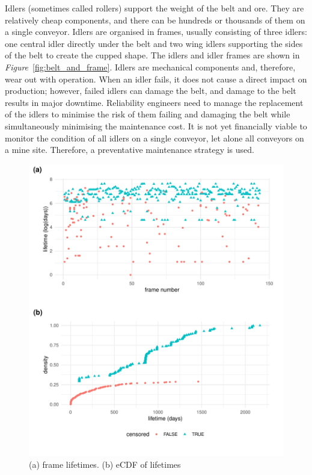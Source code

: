 Idlers (sometimes called rollers) support the weight of the belt and ore. They are relatively cheap components, and there can be hundreds or thousands of them on a single conveyor. Idlers are organised in frames, usually consisting of three idlers: one central idler directly under the belt and two wing idlers supporting the sides of the belt to create the cupped shape. The idlers and idler frames are shown in \textit{Figure}~\ref{fig:belt_and_frame}. Idlers are mechanical components and, therefore, wear out with operation. When an idler fails, it does not cause a direct impact on production; however, failed idlers can damage the belt, and damage to the belt results in major downtime. Reliability engineers need to manage the replacement of the idlers to minimise the risk of them failing and damaging the belt while simultaneously minimising the maintenance cost. It is not yet financially viable to monitor the condition of all idlers on a single conveyor, let alone all conveyors on a mine site. Therefore, a preventative maintenance strategy is used.

\begin{figure}[h]
  \centering
  \includegraphics[width=1\textwidth]{./figures/idler_data_desc.pdf}
  \caption{(a) frame lifetimes. (b) eCDF of lifetimes}
  \label{fig:idler-data}
\end{figure}

